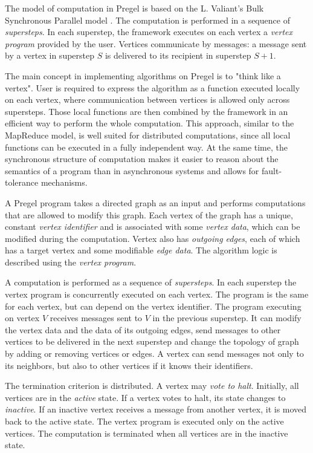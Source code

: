 The model of computation in Pregel is based on the L. Valiant's Bulk Synchronous Parallel model \cite{bsp}. The computation is performed in a sequence of \emph{supersteps}. In each superstep, the framework executes on each vertex a \emph{vertex program} provided by the user. Vertices communicate by messages: a message sent by a vertex in superstep $S$ is delivered to its recipient in superstep $S+1$.


The main concept in implementing algorithms on Pregel is to "think like a vertex". User is required to express the algorithm as a function executed locally on each vertex, where communication between vertices is allowed only across supersteps. Those local functions are then combined by the framework in an efficient way to perform the whole computation. This approach, similar to the MapReduce model, is well suited for distributed computations, since all local functions can be executed in a fully independent way. At the same time, the synchronous structure of computation makes it easier to reason about the semantics of a program than in asynchronous systems and allows for fault-tolerance mechanisms.

A Pregel program takes a directed graph as an input and performs computations that are allowed to modify this graph.
Each vertex of the graph has a unique, constant \emph{vertex identifier} and is associated with some \emph{vertex data}, which can be modified during the computation. Vertex also has \emph{outgoing edges}, each of which has a target vertex and some modifiable \emph{edge data}. The algorithm logic is described using the \emph{vertex program}.

A computation is performed as a sequence of \emph{supersteps}. In each superstep the vertex program is concurrently executed on each vertex. The program is the same for each vertex, but can depend on the vertex identifier. The program executing on vertex $V$ receives messages sent to $V$ in the previous superstep. It can modify the vertex data and the data of its outgoing edges, send messages to other vertices to be delivered in the next superstep and change the topology of graph by adding or removing vertices or edges. A vertex can send messages not only to its neighbors, but also to other vertices if it knows their identifiers.

The termination criterion is distributed. A vertex may \emph{vote to halt}. Initially, all vertices are in the \emph{active} state. If a vertex votes to halt, its state changes to \emph{inactive}. If an inactive vertex receives a message from another vertex, it is moved back to the active state. The vertex program is executed only on the active vertices. The computation is terminated when all vertices are in the inactive state.

